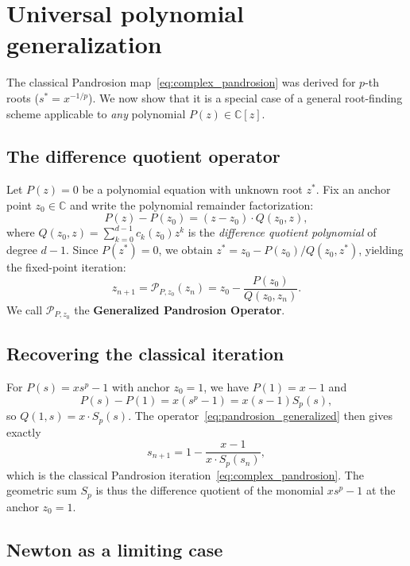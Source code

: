 \documentclass[10pt,a4paper,oneside]{book}
\theoremstyle{definition}
\theoremstyle{remark}
\newcommand{\CC}{\mathbb{C}}
\begin{document}
\section{Universal polynomial generalization}
\label{sec:universal_poly}

The classical Pandrosion map~\eqref{eq:complex_pandrosion} was derived for $p$-th roots ($s^* = x^{-1/p}$). We now show that it is a special case of a general root-finding scheme applicable to \emph{any} polynomial $P(z) \in \CC[z]$.

\subsection{The difference quotient operator}

Let $P(z) = 0$ be a polynomial equation with unknown root $z^*$. Fix an anchor point $z_0 \in \CC$ and write the polynomial remainder factorization:
\begin{equation}
  P(z) - P(z_0) = (z - z_0) \cdot Q(z_0, z),
\end{equation}
where $Q(z_0, z) = \sum_{k=0}^{d-1} c_k(z_0) z^k$ is the \emph{difference quotient polynomial} of degree $d-1$.  Since $P(z^*) = 0$, we obtain $z^* = z_0 - P(z_0)/Q(z_0, z^*)$, yielding the fixed-point iteration:
\begin{equation}
  \label{eq:pandrosion_generalized}
  \boxed{z_{n+1} = \mathcal{P}_{P, z_0}(z_n) = z_0 - \frac{P(z_0)}{Q(z_0, z_n)}.}
\end{equation}
We call $\mathcal{P}_{P, z_0}$ the \textbf{Generalized Pandrosion Operator}.

\subsection{Recovering the classical iteration}

For $P(s) = x s^p - 1$ with anchor $z_0 = 1$, we have $P(1) = x - 1$ and
\[
  P(s) - P(1) = x(s^p - 1) = x(s-1) S_p(s),
\]
so $Q(1, s) = x \cdot S_p(s)$.  The operator~\eqref{eq:pandrosion_generalized} then gives exactly
\[
  s_{n+1} = 1 - \frac{x-1}{x \cdot S_p(s_n)},
\]
which is the classical Pandrosion iteration~\eqref{eq:complex_pandrosion}.  The geometric sum $S_p$ is thus the difference quotient of the monomial $x s^p - 1$ at the anchor $z_0 = 1$.

\subsection{Newton as a limiting case}
\label{rem:newton_is_pandrosion}
\end{document}
